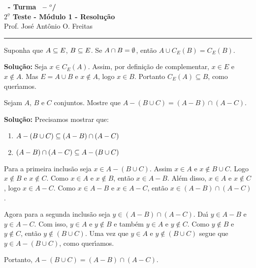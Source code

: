 \documentclass[12pt]{exam}
\begin{document}
\begin{center}
{\Large\bf \disciplina\ - Turma \turma\ -- \semestre$^{o}$/\ano} \\ \vspace{9pt} {\large\bf
$2^{\underline{o}}$ Teste - M\'odulo 1 - Resolu\c{c}\~ao}\\
\vspace{9pt} Prof. Jos{\'e} Ant{\^o}nio O. Freitas
\end{center}
\hrule

\vspace{.6cm}

\questao Suponha que $A \subseteq E$, $B \subseteq E$. Se $A \cap B = \emptyset$, então $A \cup C_E(B) = C_E(B)$.

\noindent\textbf{Solu\c{c}\~ao:} Seja $x \in C_E(A)$. Assim, por defini\c{c}\~ao de complementar, $x \in E$ e $x \notin A$. Mas $E = A \cup B$ e $x \notin A$, logo $x \in B$. Portanto $C_E(A) \subseteq B$, como quer{\'\i}amos.

\vspace{.5cm}

\questao Sejam $A$, $B$ e $C$ conjuntos. Mostre que $A - (B \cup C) = (A - B) \cap (A - C)$.

\noindent\textbf{Solu\c{c}\~ao:} Precisamos mostrar que:
\begin{enumerate}[label={\roman*})]
	\item $A - (B \cup C) \subseteq (A - B) \cap (A - C)$
	\item $(A - B) \cap (A - C) \subseteq A - (B \cup C)$
\end{enumerate}

Para a primeira inclus\~ao seja $x \in A - (B \cup C)$. Assim $x \in A$ e $x \notin B \cup C$. Logo $x \notin B$ e $x \notin C$. Como $x \in A$ e $x \notin B$, ent\~ao $x \in A - B$. Al\'em disso, $x \in A$ e $x \notin C$, logo $x \in A - C$. Como $x \in A - B$ e $x \in A - C$, ent\~ao $x \in (A - B) \cap (A - C)$.

Agora para a segunda inclus\~ao seja $y \in (A - B) \cap (A - C)$. Da{\'\i} $y \in A - B$ e $y \in A - C$. Com isso, $y \in A$ e $y \notin B$ e tamb\'em $y \in A$ e $y \notin C$. Como $y \notin B$ e $y \notin C$, ent\~ao $y \notin (B \cup C)$. Uma vez que $y \in A$ e $y \notin (B \cup C)$ segue que $y \in A - (B \cup C)$, como quer{\'\i}amos.

Portanto, $A - (B \cup C) = (A - B) \cap (A - C)$.
\end{document}
